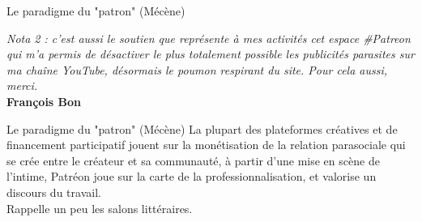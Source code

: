 \begin{frame}{Le paradigme du "patron" (Mécène)}
    \begin{center}
        {\small \textit{Nota 2 : c'est aussi le soutien que représente à mes activités cet espace \#Patreon qui m'a permis de désactiver le plus totalement possible les publicités parasites sur ma chaîne YouTube, désormais le poumon respirant du site. Pour cela aussi, merci.}}\\
        \textbf{François Bon}
    \end{center}
\end{frame}

\begin{frame}{Le paradigme du "patron" (Mécène)}
    La plupart des plateformes créatives et de financement participatif jouent sur la monétisation de la relation parasociale qui se crée entre le créateur et sa communauté, à partir d'une mise en scène de l'intime, Patréon joue sur la carte de la professionnalisation, et valorise un discours du travail.\\
    Rappelle un peu les salons littéraires.
    
\end{frame}

